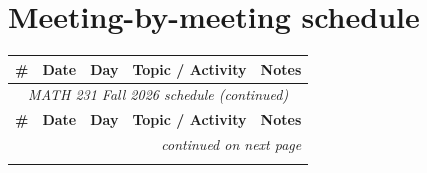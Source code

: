\documentclass[11pt]{article}
\begin{document}
\section*{Meeting-by-meeting schedule}
\renewcommand{\arraystretch}{1.5}
\begin{center}
\begin{longtable}{@{} c l c p{6.1cm} p{3.2cm} @{}}
\toprule
\textbf{\#} & \textbf{Date} & \textbf{Day} & \textbf{Topic / Activity} & \textbf{Notes} \\
\midrule
\endfirsthead
\multicolumn{5}{c}{\footnotesize\itshape MATH 231 Fall 2026 schedule (continued)}\\
\toprule
\textbf{\#} & \textbf{Date} & \textbf{Day} & \textbf{Topic / Activity} & \textbf{Notes} \\
\midrule
\endhead
\midrule
\multicolumn{5}{r}{\footnotesize\itshape continued on next page}\\
\endfoot
\bottomrule
\endlastfoot


\end{longtable}
\end{center}
\end{document}
